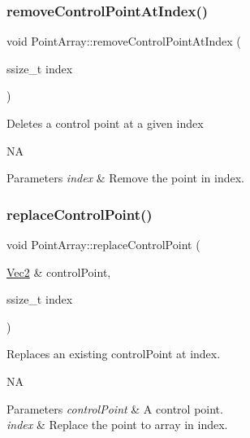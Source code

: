 \subsubsection{\texorpdfstring{remove\+Control\+Point\+At\+Index()}{removeControlPointAtIndex()}\hspace{0.1cm}{\footnotesize\ttfamily [2/2]}}
{\footnotesize\ttfamily void Point\+Array\+::remove\+Control\+Point\+At\+Index (\begin{DoxyParamCaption}\item[{ssize\+\_\+t}]{index }\end{DoxyParamCaption})}

Deletes a control point at a given index

NA 
\begin{DoxyParams}{Parameters}
{\em index} & Remove the point in index. \\
\hline
\end{DoxyParams}
\mbox{\label{classPointArray_a09527fab6aab5ff7a8ef14cad3fdb287}} 
\subsubsection{\texorpdfstring{replace\+Control\+Point()}{replaceControlPoint()}\hspace{0.1cm}{\footnotesize\ttfamily [1/2]}}
{\footnotesize\ttfamily void Point\+Array\+::replace\+Control\+Point (\begin{DoxyParamCaption}\item[{\hyperlink{classVec2}{Vec2} \&}]{control\+Point,  }\item[{ssize\+\_\+t}]{index }\end{DoxyParamCaption})}

Replaces an existing control\+Point at index.

NA 
\begin{DoxyParams}{Parameters}
{\em control\+Point} & A control point. \\
\hline
{\em index} & Replace the point to array in index. \\
\hline
\end{DoxyParams}
\mbox{\label{classPointArray_aed639ed53fa9c2db8b901b195169ac3f}} 
